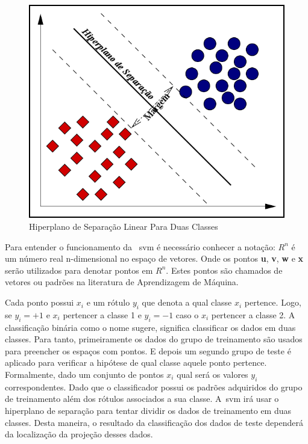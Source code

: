 \begin{figure}
 \centering
 \includegraphics[scale=0.4]{./img/svmhyperplane.png}
\caption{Hiperplano de Separação Linear Para Duas Classes}
 \label{fig:hiperplano}
\end{figure}


Para entender o funcionamento da ~\ac{svm} é necessário conhecer a notação:
\begin{math}
R^{n}
\end{math}
é um número real n-dimensional no espaço de vetores. Onde os pontos \textbf{u}, \textbf{v}, \textbf{w} e \textbf{x} serão utilizados para denotar pontos em 
\begin{math}
R^{n}
\end{math}.
Estes pontos são chamados de vetores ou padrões na literatura de Aprendizagem de Máquina.

Cada ponto possui $x_{i}$ e um rótulo $y_{i}$ que denota a qual classe $x_{i}$ pertence. Logo, se $y_{i} = + 1$ e $x_{i}$ pertencer a classe 1 e $y_{i} = - 1$ caso o $x_{i}$ pertencer a classe 2. A classificação binária como o nome sugere, significa classificar os dados em duas classes. Para tanto, primeiramente os dados do grupo de treinamento são usados para preencher os espaços com pontos. E depois um segundo grupo de teste é aplicado para verificar a hipótese de qual classe aquele ponto pertence. Formalmente, dado um conjunto de pontos $x_{i}$ qual será os valores $y_{i}$ correspondentes. Dado que o classificador possui os padrões adquiridos do grupo de treinamento além dos rótulos associados a sua classe. A~\ac{svm} irá usar o hiperplano de separação para tentar dividir os dados de treinamento em duas classes. Desta maneira, o resultado da classificação dos dados de teste dependerá da localização da projeção desses dados.

